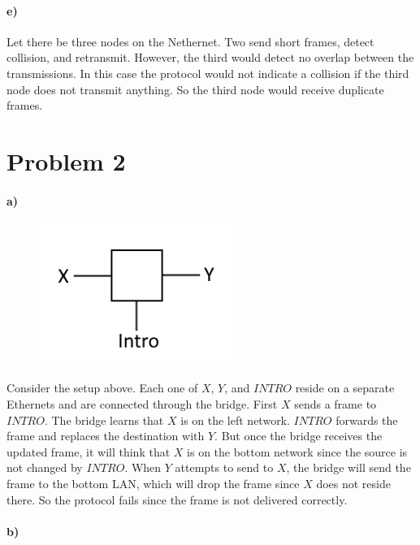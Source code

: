 \documentclass[12pt]{article}
\begin{document}
\paragraph{e)}

Let there be three nodes on the Nethernet. Two send short frames, detect collision, and retransmit. However, the third would detect no overlap between the transmissions. In this
case the protocol would not indicate a collision if the third node does not transmit anything. So the third node would receive duplicate frames.

\section*{Problem 2}

\paragraph{a)}

\begin{figure}[H]
    \begin{center}
        \includegraphics[width=2.5in]{problem2.png}
    \end{center}
\end{figure}

Consider the setup above. Each one of \(X\), \(Y\), and \(INTRO\) reside on a separate Ethernets and are connected through the bridge. First \(X\) sends a frame to \(INTRO\). The bridge learns
that \(X\) is on the left network. \(INTRO\) forwards the frame and replaces the destination with \(Y\). But once the bridge receives the updated frame, it will think that \(X\) is on the bottom
network since the source is not changed by \(INTRO\). When \(Y\) attempts to send to \(X\), the bridge will send the frame to the bottom LAN, which will drop the frame since \(X\) does not reside there.
So the protocol fails since the frame is not delivered correctly.

\paragraph{b)}
\end{document}
